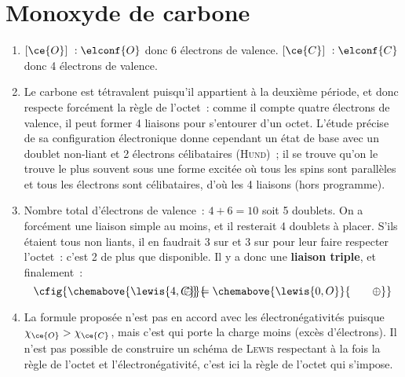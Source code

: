 \documentclass[a4paper, 12pt, final, garamond]{book}
\begin{document}
\section{Monoxyde de carbone}
\begin{enumerate}
    \item $[\ce{O}]~: \elconf{O}$ donc 6 électrons de valence. \smallbreak
        $[\ce{C}]~: \elconf{C}$ donc 4 électrons de valence.
    \item Le carbone est tétravalent puisqu'il appartient à la deuxième période,
        et donc respecte forcément la règle de l'octet~: comme il compte quatre
        électrons de valence, il peut former 4 liaisons pour s'entourer d'un
        octet. \bigbreak
        L'étude précise de sa configuration électronique donne cependant un état
        de base avec un doublet non-liant et 2 électrons célibataires
        (\textsc{Hund})~; il se trouve qu'on le trouve le plus souvent sous une
        forme excitée  où tous les spins sont parallèles et
        tous les électrons sont célibataires, d'où les 4 liaisons (hors
        programme).
    \item Nombre total d'électrons de valence~: $4+6=10$ soit 5 doublets. On a
        forcément une liaison simple au moins, et il resterait 4 doublets à
        placer. S'ils étaient tous non liants, il en faudrait 3 sur  et 3
        sur  pour leur faire respecter l'octet~: c'est 2 de plus que
        disponible. Il y a donc une \textbf{liaison triple}, et finalement~:
        \[
            \cfig{
                \chemabove{\lewis{4,C}}{\hspace{-20pt}\ominus}
                =
                \chemabove{\lewis{0,O}}{\hspace{20pt}\oplus}
            }
        \]
    \item La formule proposée n'est pas en accord avec les électronégativités
        puisque $\chi_{\ce{O}} > \chi_{\ce{C}}$, mais c'est  qui porte la
        charge moins (excès d'électrons). Il n'est pas possible de construire un
        schéma de \textsc{Lewis} respectant à la fois la règle de l'octet et
        l'électronégativité, c'est ici la règle de l'octet qui s'impose.
\end{enumerate}
\end{document}
